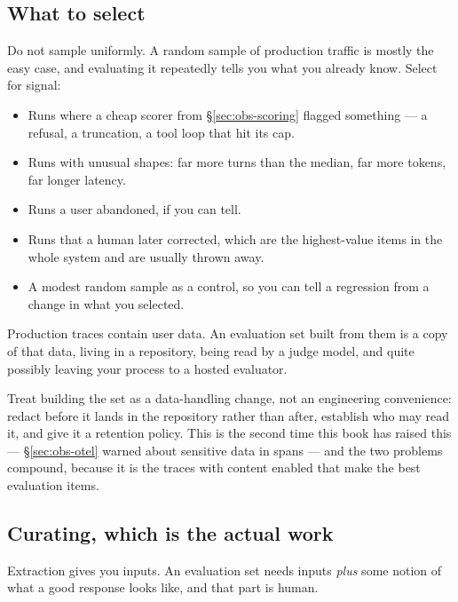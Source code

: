 \subsection{What to select}

Do not sample uniformly. A random sample of production traffic is mostly the easy
case, and evaluating it repeatedly tells you what you already know. Select for
signal:

\begin{itemize}[leftmargin=1.4em]
\item Runs where a cheap scorer from \S\ref{sec:obs-scoring} flagged something ---
      a refusal, a truncation, a tool loop that hit its cap.
\item Runs with unusual shapes: far more turns than the median, far more tokens,
      far longer latency.
\item Runs a user abandoned, if you can tell.
\item Runs that a human later corrected, which are the highest-value items in
      the whole system and are usually thrown away.
\item A modest random sample as a control, so you can tell a regression from a
      change in what you selected.
\end{itemize}

\begin{warning}
Production traces contain user data. An evaluation set built from them is a copy
of that data, living in a repository, being read by a judge model, and quite
possibly leaving your process to a hosted evaluator.

Treat building the set as a data-handling change, not an engineering
convenience: redact before it lands in the repository rather than after,
establish who may read it, and give it a retention policy. This is the second
time this book has raised this --- \S\ref{sec:obs-otel} warned about sensitive
data in spans --- and the two problems compound, because it is the traces with
content enabled that make the best evaluation items.
\end{warning}

\subsection{Curating, which is the actual work}

Extraction gives you inputs. An evaluation set needs inputs \emph{plus} some
notion of what a good response looks like, and that part is human.

